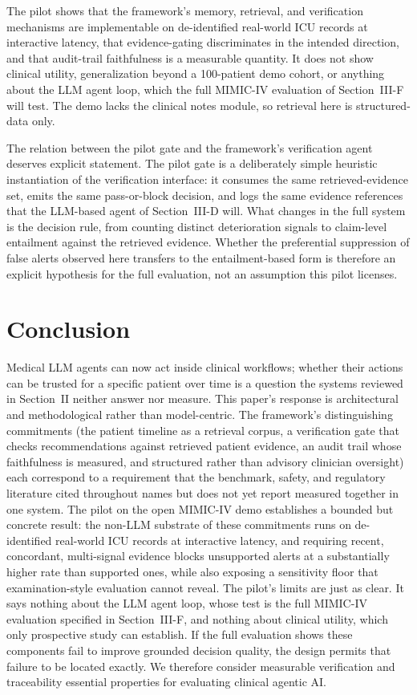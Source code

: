 The pilot shows that the framework's memory, retrieval, and verification mechanisms are
implementable on de-identified real-world ICU records at interactive latency, that evidence-gating discriminates
in the intended direction, and that audit-trail faithfulness is a measurable quantity. It
does not show clinical utility, generalization beyond a 100-patient demo cohort, or anything
about the LLM agent loop, which the full MIMIC-IV evaluation of Section~III-F will test. The
demo lacks the clinical notes module, so retrieval here is structured-data only.

The relation between the pilot gate and the framework's verification agent deserves explicit
statement. The pilot gate is a deliberately simple heuristic instantiation of the
verification interface: it consumes the same retrieved-evidence set, emits the same
pass-or-block decision, and logs the same evidence references that the LLM-based agent of
Section~III-D will. What changes in the full system is the decision rule, from counting
distinct deterioration signals to claim-level entailment against the retrieved evidence.
Whether the preferential suppression of false alerts observed here transfers to the
entailment-based form is therefore an explicit hypothesis for the full evaluation, not an
assumption this pilot licenses.


\section{Conclusion}

Medical LLM agents can now act inside clinical workflows; whether their actions can be
trusted for a specific patient over time is a question the systems reviewed in Section~II
neither answer nor measure. This paper's response is architectural and methodological rather
than model-centric. The framework's distinguishing commitments (the patient timeline as a
retrieval corpus, a verification gate that checks recommendations against retrieved patient
evidence, an audit trail whose faithfulness is measured, and structured rather than advisory
clinician oversight) each correspond to a requirement that the benchmark, safety, and regulatory
literature cited throughout names but does not yet report measured together in one system. The pilot on the open MIMIC-IV demo
establishes a bounded but concrete result: the non-LLM substrate of these commitments runs
on de-identified real-world ICU records at interactive latency, and requiring recent, concordant, multi-signal
evidence blocks unsupported alerts at a substantially higher rate than supported ones, while
also exposing a sensitivity floor that examination-style evaluation cannot reveal. The
pilot's limits are just as clear. It says nothing about the LLM agent loop, whose test
is the full MIMIC-IV evaluation specified in Section~III-F, and nothing about clinical
utility, which only prospective study can establish. If the full evaluation shows these
components fail to improve grounded decision quality, the design permits that failure to be
located exactly. We therefore consider measurable verification and traceability essential
properties for evaluating clinical agentic AI.
